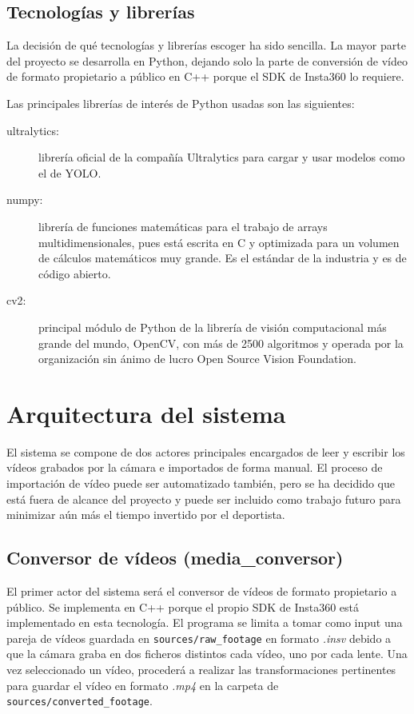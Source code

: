 \subsection{Tecnologías y librerías}

La decisión de qué tecnologías y librerías escoger ha sido sencilla. La mayor parte del proyecto se desarrolla en Python, dejando solo la parte de conversión de vídeo de formato propietario a público en C++ porque el SDK de Insta360 lo requiere.

Las principales librerías de interés de Python usadas son las siguientes:
\begin{description}
	\item[ultralytics:\cite{yolov8_ultralytics}] librería oficial de la compañía Ultralytics para cargar y usar modelos como el de YOLO.
	\item[numpy:\cite{numpy}] librería de funciones matemáticas para el trabajo de arrays multidimensionales, pues está escrita en C y optimizada para un volumen de cálculos matemáticos muy grande. Es el estándar de la industria y es de código abierto.
	\item[cv2:\cite{opencv_library}] principal módulo de Python de la librería de visión computacional más grande del mundo, OpenCV, con más de 2500 algoritmos y operada por la organización sin ánimo de lucro Open Source Vision Foundation.
\end{description}


\section[Arquitectura]{Arquitectura del sistema}
El sistema se compone de dos actores principales encargados de leer y escribir los vídeos grabados por la cámara e importados de forma manual. El proceso de importación de vídeo puede ser automatizado también, pero se ha decidido que está fuera de alcance del proyecto y puede ser incluido como trabajo futuro para minimizar aún más el tiempo invertido por el deportista.
\vspace{20px}

\subsection{Conversor de vídeos (media\_conversor)}
El primer actor del sistema será el conversor de vídeos de formato propietario a público. Se implementa en C++ porque el propio SDK de Insta360 está implementado en esta tecnología. El programa se limita a tomar como input una pareja de vídeos guardada en \verb|sources/raw_footage| en formato \textit{.insv} debido a que la cámara graba en dos ficheros distintos cada vídeo, uno por cada lente. Una vez seleccionado un vídeo, procederá a realizar las transformaciones pertinentes para guardar el vídeo en formato \textit{.mp4} en la carpeta de \verb|sources/converted_footage|.

